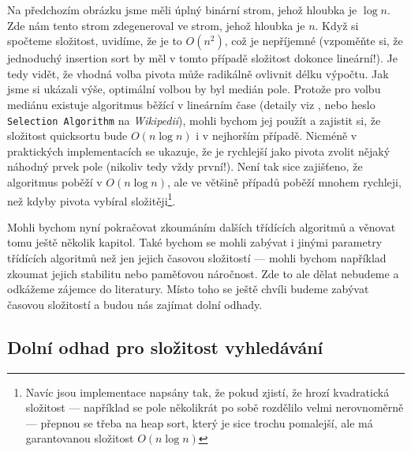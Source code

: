 Na předchozím obrázku jsme měli úplný binární strom, jehož hloubka je $\log n$. Zde nám tento strom zdegeneroval ve strom, jehož hloubka je $n$. Když si spočteme
složitost, uvidíme, že je to $O(n^2)$, což je nepříjemné (vzpoměňte si, že jednoduchý insertion sort by měl v tomto případě složitost dokonce lineární!). Je tedy
vidět, že vhodná volba pivota může radikálně ovlivnit délku výpočtu. Jak jsme si ukázali výše, optimální volbou by byl medián pole. Protože
pro volbu mediánu existuje algoritmus běžící v lineárním čase (detaily viz \cite{BFPRT:1973}, nebo heslo {\tt Selection Algorithm} na \emph{Wikipedii}),
mohli bychom jej použít a zajistit si, že složitost quicksortu bude $O(n \log n)$ i v nejhorším případě. Nicméně v praktických implementacích se ukazuje, že 
je rychlejší jako pivota zvolit nějaký náhodný prvek pole (nikoliv tedy vždy první!). Není tak sice zajišťeno, že algoritmus poběží v $O(n\log n)$, ale ve 
většině případů poběží mnohem rychleji, než kdyby pivota vybíral složitěji\footnote{Navíc jsou implementace napsány tak, že pokud zjistí, že hrozí kvadratická
složitost --- například se pole několikrát po sobě rozdělilo velmi nerovnoměrně --- přepnou se třeba na heap sort, který je sice trochu pomalejší, ale má
garantovanou složitost $O(n\log n)$}.

Mohli bychom nyní pokračovat zkoumáním dalších třídících algoritmů a věnovat tomu ještě několik kapitol. Také bychom se mohli zabývat i jinými parametry
třídících algoritmů než jen jejich časovou složitostí --- mohli bychom například zkoumat jejich stabilitu nebo paměťovou náročnost. Zde to ale dělat
nebudeme a odkážeme zájemce do literatury. Místo toho se ještě chvíli budeme zabývat časovou složitostí a budou nás zajímat dolní odhady.

\subsection*{Dolní odhad pro složitost vyhledávání}

